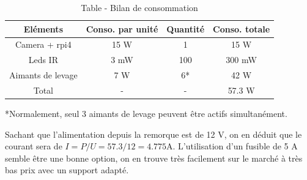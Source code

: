 \begin{table}[H]
    \begin{center}
        \caption{Table - Bilan de consommation}
        \begin{tabular}{|c|c|c|c|}
            Eléments            & Conso. par unité   & Quantité & Conso. totale        \\ \hline
            Camera + \Gls{rpi4} & 15 \si{\watt}      & 1        & 15    \si{\watt}     \\
            Leds IR             & 3 \si{\milli\watt} & 100      & 300 \si{\milli\watt} \\
            Aimants de levage   & 7 \si{\watt}       & 6*       & 42 \si{\watt}        \\
            Total               & -                  & -        & 57.3 \si{\watt}      \\
        \end{tabular}
    \end{center}

    *Normalement, seul 3 aimants de levage peuvent être actifs simultanément.
\end{table}

Sachant que l'alimentation depuis la remorque est de 12 \si{\volt}, on en déduit que le courant sera de \(I = P/U = 57.3/12 = 4.775 \si{\ampere} \).
L'utilisation d'un fusible de 5 \si{\ampere} semble être une bonne option, on en trouve très facilement sur le marché à très bas prix avec un support adapté.